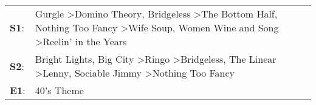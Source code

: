 \begin{supertabular}{p{0.03\textwidth}p{0.92\textwidth}}
 \textbf{S1}:  &  Gurgle\textsuperscript{} \textgreater \enspace Domino Theory\textsuperscript{}, \enspace Bridgeless\textsuperscript{} \textgreater \enspace The Bottom Half\textsuperscript{}, \enspace Nothing Too Fancy\textsuperscript{} \textgreater \enspace Wife Soup\textsuperscript{}, \enspace Women Wine and Song\textsuperscript{} \textgreater \enspace Reelin' in the Years\textsuperscript{}  \enspace  \\
 \textbf{S2}:  &                                                        Bright Lights, Big City\textsuperscript{} \textgreater \enspace Ringo\textsuperscript{} \textgreater \enspace Bridgeless\textsuperscript{}, \enspace The Linear\textsuperscript{} \textgreater \enspace Lenny\textsuperscript{}, \enspace Sociable Jimmy\textsuperscript{} \textgreater \enspace Nothing Too Fancy\textsuperscript{}  \enspace  \\
 \textbf{E1}:  &                                                                                                                                                                                                                                                                                                                                                                40's Theme\textsuperscript{}  \enspace  \\
\end{supertabular}

